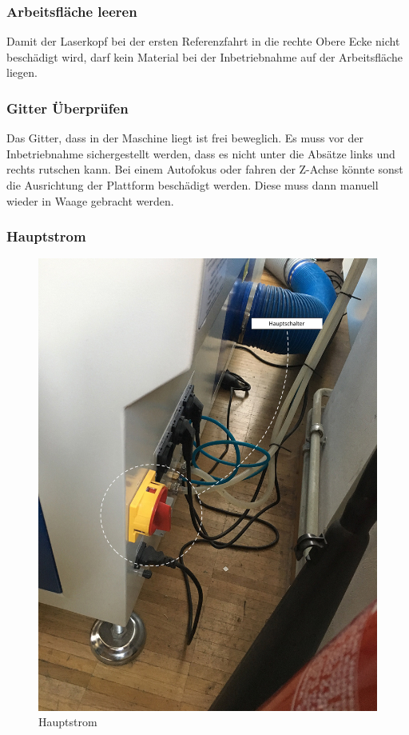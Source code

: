 \documentclass[]{article}
\begin{document}
\hypertarget{arbeitsfluxe4che-leeren}{%
\subsubsection{Arbeitsfläche leeren}\label{arbeitsfluxe4che-leeren}}

Damit der Laserkopf bei der ersten Referenzfahrt in die rechte Obere
Ecke nicht beschädigt wird, darf kein Material bei der Inbetriebnahme
auf der Arbeitsfläche liegen.

\hypertarget{gitter-uxfcberpruxfcfen}{%
\subsubsection{Gitter Überprüfen}\label{gitter-uxfcberpruxfcfen}}

Das Gitter, dass in der Maschine liegt ist frei beweglich. Es muss vor
der Inbetriebnahme sichergestellt werden, dass es nicht unter die
Absätze links und rechts rutschen kann. Bei einem Autofokus oder fahren
der Z-Achse könnte sonst die Ausrichtung der Plattform beschädigt
werden. Diese muss dann manuell wieder in Waage gebracht werden.

\hypertarget{hauptstrom}{%
\subsubsection{Hauptstrom}\label{hauptstrom}}

\begin{figure}
\hypertarget{fig:hauptschalter}{%
\centering
\includegraphics{assets/images/hauptschalter.jpg}
\caption{Hauptstrom}\label{fig:hauptschalter}
}
\end{figure}
\end{document}
